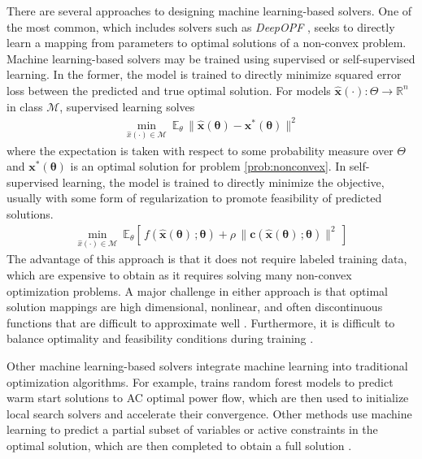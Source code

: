 \documentclass[10pt]{article} %
\theoremstyle{plain}
\theoremstyle{definition}
\theoremstyle{remark}
\begin{document}
There are several approaches to designing machine learning-based solvers. One of the most common, which includes solvers such as \textit{DeepOPF} \citep{pan2022deepopf}, seeks to directly learn a mapping from parameters to optimal solutions of a non-convex problem. Machine learning-based solvers may be trained using supervised or self-supervised learning. In the former, the model is trained to directly minimize squared error loss between the predicted and true optimal solution. For models $\hat{\mathbf{x}}(\cdot): \Theta \to \mathbb{R}^n$ in class $\mathcal{M}$, supervised learning solves
\begin{equation}
\begin{aligned}
    \min_{\hat{x}(\cdot) \in \mathcal{M}}~ \mathbb{E}_\theta\, \| \hat{\mathbf{x}}(\bm{\theta}) - \mathbf{x}^*(\bm{\theta})\|^2
\end{aligned}
\end{equation}
where the expectation is taken with respect to some probability measure over $\Theta$ and $\mathbf{x}^*(\bm{\theta})$ is an optimal solution for problem \cref{prob:nonconvex}{}{}.
In self-supervised learning, the model is trained to directly minimize the objective, usually with some form of regularization to promote feasibility of predicted solutions.
\begin{equation}
\begin{aligned}
    \min_{\hat{x}(\cdot) \in \mathcal{M}}~ \mathbb{E}_\theta \left[ \, f(\hat{\mathbf{x}}(\bm{\theta})\,; \bm{\theta}) + \rho \, \|\mathbf{c}(\hat{\mathbf{x}}(\bm{\theta})\,; \bm{\theta})\|^2 \,\right]
\end{aligned}
\end{equation}
The advantage of this approach is that it does not require labeled training data, which are expensive to obtain as it requires solving many non-convex optimization problems. A major challenge in either approach is that optimal solution mappings are high dimensional, nonlinear, and often discontinuous functions that are difficult to approximate well \citep{pan2022deepopf}. Furthermore, it is difficult to balance optimality and feasibility conditions during training \citep{park2023self}.

Other machine learning-based solvers integrate machine learning into traditional optimization algorithms. For example, \citet{baker2019learning} trains random forest models to predict warm start solutions to AC optimal power flow, which are then used to initialize local search solvers and accelerate their convergence. Other methods use machine learning to predict a partial subset of variables or active constraints in the optimal solution, which are then completed to obtain a full solution \citep{donti2021dc3, deka2019learning}.
\end{document}
